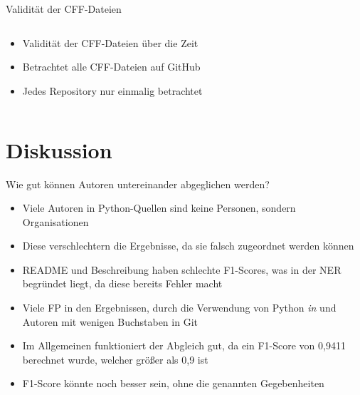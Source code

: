 \documentclass[%
    handout,
    aspectratio=1610,
    10pt,
    onlytextwidth, %
]{beamer}
\begin{document}
\begin{frame}{Validität der CFF-Dateien}
    \begin{columns}
        \begin{column}[t]{0.29\textwidth}
            \begin{itemize}
                \item Validität der CFF-Dateien über die Zeit
                \item Betrachtet alle CFF-Dateien auf GitHub
                \item Jedes Repository nur einmalig betrachtet
            \end{itemize}
        \end{column}
        \begin{column}[t]{0.69\textwidth}
            \begin{center}
                
            \end{center}
        \end{column}
    \end{columns}
\end{frame}

\section{Diskussion}

\begin{frame}{Wie gut können Autoren untereinander abgeglichen werden?}
    \begin{itemize}
        \item Viele Autoren in Python-Quellen sind keine Personen, sondern Organisationen
        \item Diese verschlechtern die Ergebnisse, da sie falsch zugeordnet werden können
        \item README und Beschreibung haben schlechte F1-Scores, was in der NER begründet liegt, da diese bereits Fehler macht
        \item Viele FP in den Ergebnissen, durch die Verwendung von Python \emph{in} und Autoren mit wenigen Buchstaben in Git
        \item Im Allgemeinen funktioniert der Abgleich gut, da ein F1-Score von 0,9411 berechnet wurde, welcher größer als 0,9 ist
        \item F1-Score könnte noch besser sein, ohne die genannten Gegebenheiten
    \end{itemize}
\end{frame}
\end{document}
